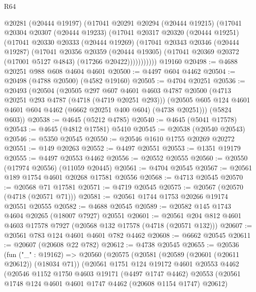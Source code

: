 \begin{lexlean}{R64}
\begin{coremodule}
          @20281
          (@20444 @19197)
          (@17041
            @20291
            @20294
            (@20444 @19215)
            (@17041
              @20304
              @20307
              (@20444 @19233)
              (@17041
                @20317
                @20320
                (@20444 @19251)
                (@17041
                  @20330
                  @20333
                  (@20444 @19269)
                  (@17041
                    @20343
                    @20346
                    (@20444 @19287)
                    (@17041
                      @20356
                      @20359
                      (@20444 @19305)
                      (@17041 @20369 @20372 (@17001 @5127 @4843) (@17266 @20422)))))))))))
    @19160
@20498 := @4688 @20251 @988 @608 @4604 @4601
@20500 := @4497 @604 @4462
@20504 := @20498 (@4788 @20500) (@4582 @19160)
@20505 := @4704 @20251
@20536 := @20493
    (@20504
      (@20505
        @297
        @607
        @4601
        @4603
        @4787
        @20500
        (@4713 @20251 @293 @4787 (@4718 (@4719 @20251 @293)))
        (@20505 @605 @124 @4601 @4601 @604 @4462 (@6662 @20251 @400 @604) (@4738 @20251)))
      (@5824 @603))
@20538 := @4645 (@5212 @4785)
@20540 := @4645 (@5041 @17578)
@20543 := @4645 (@4812 @17581) @5410
@20545 := @20538 (@20540 @20543)
@20546 := @5350 @20545
@20550 := @20546 @1610 @1755 @20269 @20272
@20551 := @149 @20263
@20552 := @4497 @20551
@20553 := @1351 @19179
@20555 := @4497 @20553 @4462
@20556 := @20552 @20555
@20560 := @20550 (@17974 @20556) (@11059 @20445)
@20561 := @4704 @20545
@20567 := @20561 @189 @1754 @4601 @20268 @17581 @20556
@20568 := @4713 @20545
@20570 := @20568 @71 @17581
@20571 := @4719 @20545
@20575 := @20567 (@20570 (@4718 (@20571 @71)))
@20581 := @20561 @1744 @1753 @20266 @19174 @20551 @20555
@20582 := @4688 @20545
@20589 := @20582 @145 @1743 @4604 @20265 (@18007 @7927) @20551
@20601 := @20561 @204 @812 @4601 @4603 @17578 @7927 (@20568 @132 @17578 (@4718 (@20571 @132)))
@20607 := @20561 @783 @124 @4601 @4601 @782 @4462
@20608 := @6662 @20545
@20611 := @20607 (@20608 @22 @782)
@20612 := @4738 @20545
@20655 := @20536
    (fun ("_" : @19162) =>
    @20560
      (@20575
        (@20581
          (@20589 (@20601 (@20611 @20612)) (@18034 @71))
          (@20561
            @1751
            @124
            @19172
            @4601
            @20553
            @4462
            (@20546
              @1152
              @1750
              @4603
              @19171
              (@4497 @1747 @4462)
              @20553
              (@20561 @1748 @124 @4601 @4601 @1747 @4462 (@20608 @1154 @1747) @20612)

\end{coremodule}
\end{lexlean}
